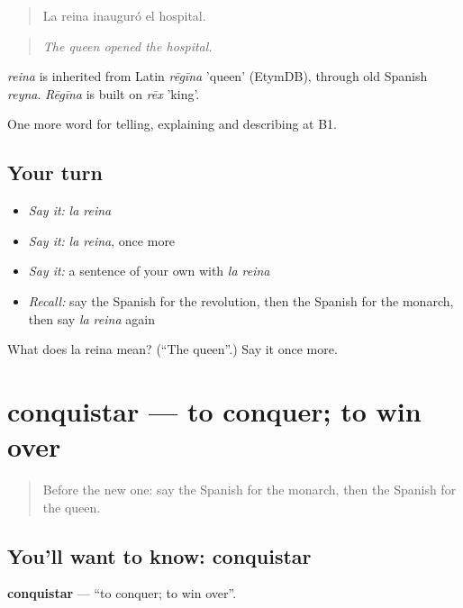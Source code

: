 \begin{quote}
La reina inauguró el hospital.
\end{quote}

\begin{quote}
\emph{The queen opened the hospital.}
\end{quote}

\begin{cousinweb}
\emph{reina} is inherited from Latin \emph{rēgīna} 'queen' (EtymDB), through old Spanish \emph{reyna}. \emph{Rēgīna} is built on \emph{rēx} 'king'.
\end{cousinweb}

\begin{grammarlens}[title={What you've built}]
One more word for telling, explaining and describing at B1.
\end{grammarlens}

\subsection*{Your turn}
\begin{itemize}
\raggedright
  \item \emph{Say it:} \emph{la reina}
  \item \emph{Say it:} \emph{la reina}, once more
  \item \emph{Say it:} a sentence of your own with \emph{la reina}
  \item \emph{Recall:} say the Spanish for the revolution, then the Spanish for the monarch, then say \emph{la reina} again
\end{itemize}

\begin{tcolorbox}[breakable,colback=teal!4,colframe=teal!35!black,title={Before you move on}]
What does la reina mean? (\textquotedblleft{}The queen\textquotedblright{}.) Say it once more.
\end{tcolorbox}
\section[conquistar]{conquistar — to conquer; to win over}

\label{lesson:ES-C568-conquistar}



\begin{quote}
Before the new one: say the Spanish for the monarch, then the Spanish for the queen.
\end{quote}

\subsection*{You'll want to know: conquistar}
\textbf{conquistar} — \textquotedblleft{}to conquer; to win over\textquotedblright{}.

